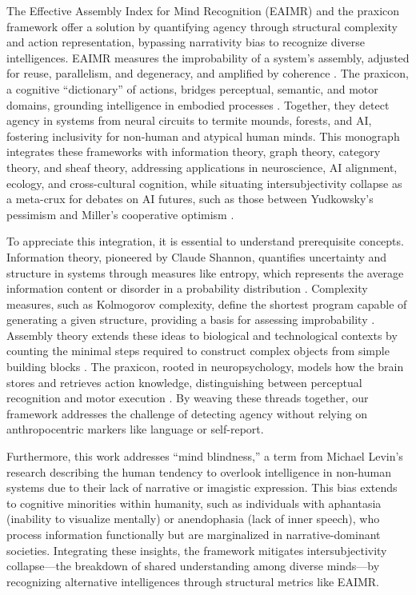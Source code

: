 \documentclass{article}
\begin{document}
The Effective Assembly Index for Mind Recognition (EAIMR) and the praxicon framework offer a solution by quantifying agency through structural complexity and action representation, bypassing narrativity bias to recognize diverse intelligences. EAIMR measures the improbability of a system’s assembly, adjusted for reuse, parallelism, and degeneracy, and amplified by coherence \citep{walker2013}. The praxicon, a cognitive ``dictionary'' of actions, bridges perceptual, semantic, and motor domains, grounding intelligence in embodied processes \citep{pastra2011,peigneux2004}. Together, they detect agency in systems from neural circuits to termite mounds, forests, and AI, fostering inclusivity for non-human and atypical human minds. This monograph integrates these frameworks with information theory, graph theory, category theory, and sheaf theory, addressing applications in neuroscience, AI alignment, ecology, and cross-cultural cognition, while situating intersubjectivity collapse as a meta-crux for debates on AI futures, such as those between Yudkowsky’s pessimism and Miller’s cooperative optimism \citep{yudkowsky2008artificial,miller2006robust}.

To appreciate this integration, it is essential to understand prerequisite concepts. Information theory, pioneered by Claude Shannon, quantifies uncertainty and structure in systems through measures like entropy, which represents the average information content or disorder in a probability distribution \citep{shannon1948}. Complexity measures, such as Kolmogorov complexity, define the shortest program capable of generating a given structure, providing a basis for assessing improbability \citep{kolmogorov1965}. Assembly theory extends these ideas to biological and technological contexts by counting the minimal steps required to construct complex objects from simple building blocks \citep{walker2013}. The praxicon, rooted in neuropsychology, models how the brain stores and retrieves action knowledge, distinguishing between perceptual recognition and motor execution \citep{peigneux2004}. By weaving these threads together, our framework addresses the challenge of detecting agency without relying on anthropocentric markers like language or self-report.

Furthermore, this work addresses ``mind blindness,'' a term from Michael Levin’s research describing the human tendency to overlook intelligence in non-human systems due to their lack of narrative or imagistic expression. This bias extends to cognitive minorities within humanity, such as individuals with aphantasia (inability to visualize mentally) or anendophasia (lack of inner speech), who process information functionally but are marginalized in narrative-dominant societies. Integrating these insights, the framework mitigates intersubjectivity collapse---the breakdown of shared understanding among diverse minds---by recognizing alternative intelligences through structural metrics like EAIMR.
\end{document}
